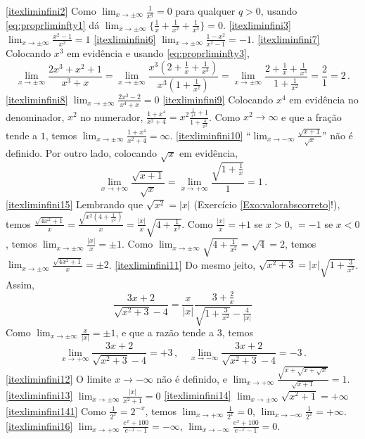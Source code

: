 \begin{Solution}{4.7}
\eqref{itexliminfini2} Como $\lim_{x\to\pm\infty}\frac{1}{x^q}=0$ para
qualquer $q>0$, usando \eqref{eq:proprliminfty1} dá
$\lim_{x\to
\pm\infty}\{\frac{1}{x}+\frac{1}{x^2}+\frac{1}{x^3}\}=0$.
\eqref{itexliminfini3} $\lim_{x\to \pm\infty}\frac{x^2-1}{x^2}=1$
\eqref{itexliminfini6} $\lim_{x\to\pm\infty}\frac{1-x^2}{x^2-1}=-1$.
\eqref{itexliminfini7} Colocando $x^3$ em evidência e usando
\eqref{eq:proprliminfty3},
$$\lim_{x\to\pm\infty}\frac{2x^3+x^2+1}{x^3+x}=\lim_{x\to
\pm\infty}\frac{x^3(2+\frac{1}{x}+\frac{1}{x^3})}{x^3(1+\frac{1}{x^2})
} =\lim_{x\to
\pm\infty}\frac{2+\frac{1}{x}+\frac{1}{x^3}}{1+\frac{1}{x^2}}=\frac{2}
{1}=2\,.$$
\eqref{itexliminfini8} $\lim_{x\to
\pm\infty}\frac{2x^3-2}{x^4+x}=0$
\eqref{itexliminfini9} Colocando $x^4$ em
evidência no denominador, $x^2$ no numerador,
$\frac{1+x^4}{x^2+4}=x^2\frac{\frac{1}{x^4}+1}{1+\frac{4}{x^2}}$.
Como $x^2\to\infty$ e que a fração tende a $1$, temos
$\lim_{x\to\pm\infty}\frac{1+x^4}{x^2+4}=\infty$.
\eqref{itexliminfini10} ``$\lim_{x\to
-\infty}\frac{\sqrt{x+1}}{\sqrt{x}}$'' não é definido.
Por outro lado, colocando $\sqrt{x}$ em evidência,
$$\lim_{x\to+\infty}\frac{\sqrt{x+1}}{\sqrt{x}}=
\lim_{x\to +\infty}\frac{\sqrt{1+\frac{1}{{x}}}}{1}=1\,.
$$
\eqref{itexliminfini15}
Lembrando que $\sqrt{x^2}=|x|$ (Exercício
\ref{Exo:valorabscorreto}!), temos
$\frac{\sqrt{4x^2+1}}{x}=\frac{\sqrt{x^2(4+\frac{1}{x^2})}}{x}=\frac{
|x|}{x}\sqrt{4+\frac{1}{x^2}}$.
Como $\frac{|x|}{x}=+1$ se $x>0$, $=-1$ se $x<0$, temos $\lim_{x\to\pm\infty}\frac{|x|}{x}=\pm 1$. Como
$\lim_{x\to\pm\infty}\sqrt{4+\frac{1}{x^2}}=\sqrt{4}=2$, temos
$\lim_{x\to\pm\infty}\frac{\sqrt{4x^2+1}}{x}=\pm 2$.
\eqref{itexliminfini11}
Do mesmo jeito,
$\sqrt{x^2+3}=|x|\sqrt{1+\frac{3}{x^2}}$. Assim,
$$
\frac{3x+2}{\sqrt{x^2+3}-4}=\frac{x}{|x|}\frac{3+\frac{2}{x}}{\sqrt{1+
\frac{3}{x^2}}-\frac{4}{|x|}}
$$
Como $\lim_{x\to\pm\infty}\frac{x}{|x|}=\pm 1$, e que a razão tende a
$3$, temos
$$\lim_{x\to+\infty}\frac{3x+2}{\sqrt{x^2+3}-4}=+3\,,\quad
\lim_{x\to-\infty}\frac{3x+2}{\sqrt{x^2+3}-4}=-3\,.
$$
\eqref{itexliminfini12} O limite $x\to-\infty$
não é definido, e $\lim_{x\to+\infty}
\frac{\sqrt{x+\sqrt{x+\sqrt{x}}}}{\sqrt{x+1}}=1$.
\eqref{itexliminfini13} $\lim_{x\to\pm\infty}\frac{|x|}{x^2+1}=0$
\eqref{itexliminfini14} $\lim_{x\to\pm\infty}\sqrt{x^2+1}=+\infty$
\eqref{itexliminfini141} Como $\frac{1}{2^x}=2^{-x}$, temos $\lim_{x\to+\infty}\frac{1}{2^x}=0$,
$\lim_{x\to-\infty}\frac{1}{2^x}=+\infty$.
\eqref{itexliminfini16}
$\lim_{x\to+\infty}\frac{e^x+100}{e^{-x}-1}=-\infty$,
$\lim_{x\to-\infty}\frac{e^x+100}{e^{-x}-1}=0$.

\end{Solution}
